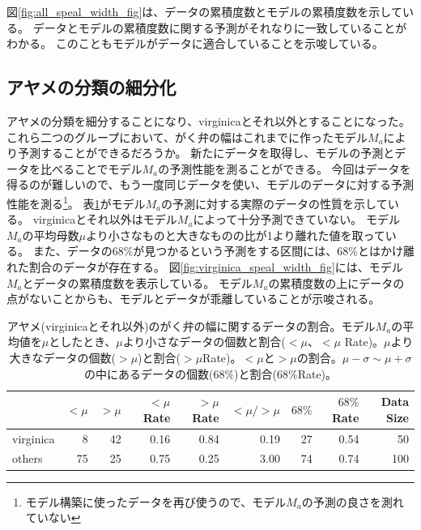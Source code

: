 図\ref{fig:all_speal_width_fig}は、データの累積度数とモデルの累積度数を示している。
データとモデルの累積度数に関する予測がそれなりに一致していることがわかる。
このこともモデルがデータに適合していることを示唆している。

\subsection{アヤメの分類の細分化}
アヤメの分類を細分することになり、virginicaとそれ以外とすることになった。
これら二つのグループにおいて、がく弁の幅はこれまでに作ったモデル$M_a$により予測することができるだろうか。
新たにデータを取得し、モデルの予測とデータを比べることでモデル$M_a$の予測性能を測ることができる。
今回はデータを得るのが難しいので、もう一度同じデータを使い、モデルのデータに対する予測性能を測る\footnote{モデル構築に使ったデータを再び使うので、モデル$M_a$の予測の良さを測れていない}。
表\ref{table:speal_width_virig}がモデル$M_a$の予測に対する実際のデータの性質を示している。
virginicaとそれ以外はモデル$M_a$によって十分予測できていない。
モデル$M_a$の平均母数$\mu$より小さなものと大きなものの比が1より離れた値を取っている。
また、データの$68\%$が見つかるという予測をする区間には、$68\%$とはかけ離れた割合のデータが存在する。
図\ref{fig:virginica_speal_width_fig}には、モデル$M_a$とデータの累積度数を表示している。
モデル$M_a$の累積度数の上にデータの点がないことからも、モデルとデータが乖離していることが示唆される。
 

\begin{table}[h]
    \caption{アヤメ(virginicaとそれ以外)のがく弁の幅に関するデータの割合。モデル$M_a$の平均値を$\mu$としたとき、$\mu$より小さなデータの個数と割合($<\mu$、$<\mu$ Rate)。$\mu$より大きなデータの個数($>\mu$)と割合($>\mu$Rate)。$<\mu$と$>\mu$の割合。$\mu-\sigma\sim \mu+\sigma$の中にあるデータの個数($68\%$)と割合($68\%$Rate)。}
    \label{table:speal_width_virig}
    \centering
    \begin{tabular}{lrrrrrrrr}

        \hline
        {} &  $<\mu$ &  $>\mu$ &  $<\mu$ Rate &  $>\mu$ Rate &  $<\mu/>\mu$ &  $68\%$ &  $68\%$Rate &  Data Size \\
        \hline \hline
        virginica   &     8 &    42 &       0.16 &       0.84 &       0.19 &   27 &     0.54 &         50 \\
        others &    75 &    25 &       0.75 &       0.25 &       3.00 &   74 &     0.74 &        100 \\
        \hline
    \end{tabular}
\end{table}
    
